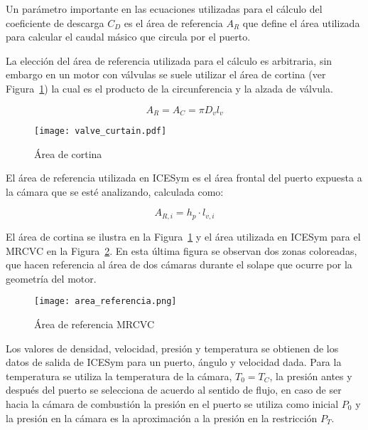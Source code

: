 Un parámetro importante en las ecuaciones utilizadas para el cálculo del
coeficiente de descarga $C_{D}$ es el área de referencia $A_{R}$ que define el
área utilizada para calcular el caudal másico que circula por el puerto.
%

La elección del área de referencia utilizada para el cálculo es arbitraria, sin
embargo en un motor con válvulas se suele utilizar el área de cortina (ver
Figura~\ref{fig:area_cortina}) la cual es el producto de la circunferencia y la
alzada de válvula.

\begin{equation} \label{eq:area_cortina}
  A_R = A_C = \pi D_v l_v
\end{equation}


\begin{figure} \centering
\texttt{[image: valve\_curtain.pdf]}
  \caption{Área de cortina}\label{fig:area_cortina}
\end{figure}

El área de referencia utilizada en ICESym es el área frontal del puerto expuesta
a la cámara que se esté analizando, calculada como:

\begin{equation}\label{eq:ar_mrcvc}
  A_{R,i} = h_{p} \cdot l_{v,i}
\end{equation}

El área de cortina se ilustra en la Figura~\ref{fig:area_cortina} y el área
utilizada en ICESym para el MRCVC en la Figura~\ref{fig:area_referencia}.
%
En esta última figura se observan dos zonas coloreadas, que hacen referencia al
área de dos cámaras durante el solape que ocurre por la geometría del motor.

\begin{figure}
  \centering
  \texttt{[image: area\_referencia.png]}
  \caption{Área de referencia MRCVC}\label{fig:area_referencia}
\end{figure}

Los valores de densidad, velocidad, presión y temperatura se obtienen de los
datos de salida de ICESym para un puerto, ángulo y velocidad dada.
%
Para la temperatura se utiliza la temperatura de la cámara, $T_0 = T_C$, la
presión antes y después del puerto se selecciona de acuerdo al sentido de flujo,
en caso de ser hacia la cámara de combustión la presión en el puerto se utiliza
como inicial $P_0$ y la presión en la cámara es la aproximación a la presión en
la restricción $P_T$.

